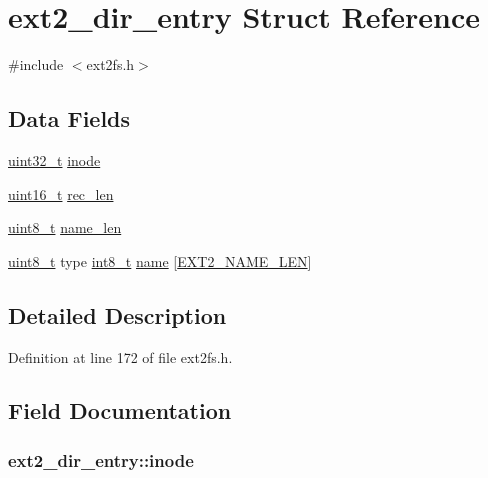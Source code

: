 \hypertarget{structext2__dir__entry}{\section{ext2\-\_\-dir\-\_\-entry \-Struct \-Reference}
\label{structext2__dir__entry}
}


{\ttfamily \#include $<$ext2fs.\-h$>$}

\subsection*{\-Data \-Fields}
\begin{DoxyCompactItemize}
\item 
\hyperlink{types_8h_a435d1572bf3f880d55459d9805097f62}{uint32\-\_\-t} \hyperlink{structext2__dir__entry_a0c2ea9c16de9cfe77149eca19f111ecd}{inode}
\item 
\hyperlink{types_8h_a273cf69d639a59973b6019625df33e30}{uint16\-\_\-t} \hyperlink{structext2__dir__entry_a41bbc1d811b1585d250f65ac9fe4d5ea}{rec\-\_\-len}
\item 
\hyperlink{types_8h_aba7bc1797add20fe3efdf37ced1182c5}{uint8\-\_\-t} \hyperlink{structext2__dir__entry_a12cf64436f759f163233b581a0eebe5f}{name\-\_\-len}
\item 
\hyperlink{types_8h_aba7bc1797add20fe3efdf37ced1182c5}{uint8\-\_\-t} type \hyperlink{types_8h_ad566f6541e98b74246db1a3a3a85ad49}{int8\-\_\-t} \hyperlink{structext2__dir__entry_a125bd2ee71a4dfe8ce6f3310932bfc15}{name} \mbox{[}\hyperlink{ext2fs_8h_a314a7f6544f6f42a028068c0ce164391}{\-E\-X\-T2\-\_\-\-N\-A\-M\-E\-\_\-\-L\-E\-N}\mbox{]}
\end{DoxyCompactItemize}


\subsection{\-Detailed \-Description}


\-Definition at line 172 of file ext2fs.\-h.



\subsection{\-Field \-Documentation}
\hypertarget{structext2__dir__entry_a0c2ea9c16de9cfe77149eca19f111ecd}{
\subsubsection[{inode}]{ {\bf ext2\-\_\-dir\-\_\-entry\-::inode}}}\label{structext2__dir__entry_a0c2ea9c16de9cfe77149eca19f111ecd}


